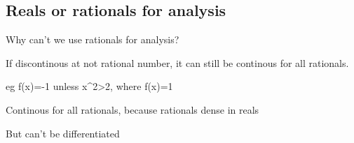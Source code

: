 
\subsection{Reals or rationals for analysis}

Why can't we use rationals for analysis?

If discontinous at not rational number, it can still be continous for all rationals.

eg f(x)=-1 unless x^2>2, where f(x)=1

Continous for all rationals, because rationals dense in reals

But can't be differentiated

